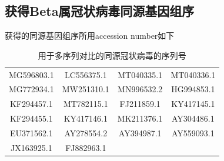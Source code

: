 \documentclass[supercite]{HustGraduPaper}
\begin{document}
  \subsection{获得Beta属冠状病毒同源基因组序}获得的同源基因组序所用accession number如下
	\begin{table}[H]
		\begin{center}
			\begin{tabular}{|cccc|}
				\hline
				MG596803.1 & LC556375.1 & MT040335.1 & MT040336.1 \\
				MG772934.1 & MW251310.1 & MN996532.2 & HG994853.1 \\
        KF294457.1 & MT782115.1 & FJ211859.1 & KY417145.1 \\
				KF294455.1 & KY417146.1 & MK211376.1 & AY304486.1 \\
				EU371562.1 & AY278554.2 & AY394987.1 & AY559093.1 \\
				JX163925.1 & FJ882963.1 & ~ & ~ \\ \hline
			\end{tabular}
			\caption{用于多序列对比的同源冠状病毒的序列号}
		\end{center}
	\end{table}
\end{document}
